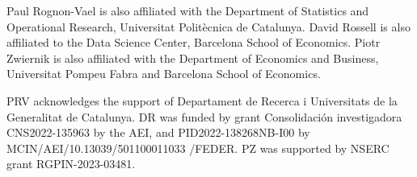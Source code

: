 \documentclass[aos]{imsart}
\theoremstyle{plain}
\begin{document}
%
%

\begin{acks}[Acknowledgments]
Paul Rognon-Vael is also affiliated with the Department of Statistics and Operational Research, Universitat Politècnica de Catalunya. David Rossell is also affiliated to the Data Science Center, Barcelona School of Economics. Piotr Zwiernik is also affiliated with the Department of Economics and Business, Universitat Pompeu Fabra and Barcelona School of
Economics.

\end{acks}
\begin{funding}
PRV acknowledges the support of Departament de Recerca i Universitats de la Generalitat de Catalunya.  DR was funded by grant Consolidaci\'on investigadora CNS2022-135963 by the AEI, and PID2022-138268NB-I00 by MCIN/AEI/10.13039/501100011033 /FEDER.
PZ was supported by NSERC grant RGPIN-2023-03481.

\end{funding}
\end{document}
